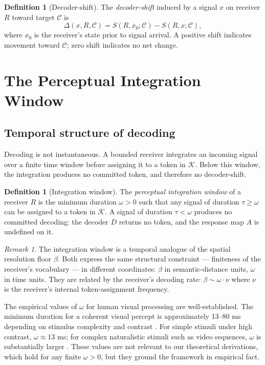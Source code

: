 \documentclass[twocolumn,11pt,a4paper]{article}
\theoremstyle{main}
\theoremstyle{definition}
\newtheorem{definition}[theorem]{Definition}
\theoremstyle{remark}
\newtheorem{remark}[theorem]{Remark}
\newcommand{\Know}{\mathcal{K}}
\newcommand{\Cell}{\mathcal{C}}
\newcommand{\Dec}{D}
\newcommand{\Recv}{R}
\newcommand{\Sval}{S}
\newcommand{\floor}{\beta}
\newcommand{\shift}{\Delta}
\newcommand{\window}{\omega}
\begin{document}
\begin{definition}[Decoder-shift]
\label{def:shift}
The \emph{decoder-shift} induced by a signal $x$ on receiver $\Recv$
toward target $\Cell$ is
\[
  \shift(x, \Recv, \Cell) = \Sval(\Recv, x_0; \Cell)
  - \Sval(\Recv, x; \Cell),
\]
where $x_0$ is the receiver's state prior to signal arrival. A positive
shift indicates movement toward $\Cell$; zero shift indicates no net
change.
\end{definition}

\section{The Perceptual Integration Window}
\label{sec:window}

\subsection{Temporal structure of decoding}

Decoding is not instantaneous. A bounded receiver integrates an incoming
signal over a finite time window before assigning it to a token in
$\Know$. Below this window, the integration produces no committed token,
and therefore no decoder-shift.

\begin{definition}[Integration window]
\label{def:window}
The \emph{perceptual integration window} of a receiver $\Recv$ is the
minimum duration $\window > 0$ such that any signal of duration
$\tau \geq \window$ can be assigned to a token in $\Know$. A signal of
duration $\tau < \window$ produces no committed decoding: the decoder
$\Dec$ returns no token, and the response map $A$ is undefined on it.
\end{definition}

\begin{remark}
The integration window is a temporal analogue of the spatial resolution
floor $\floor$. Both express the same structural constraint ---
finiteness of the receiver's vocabulary --- in different coordinates:
$\floor$ in semantic-distance units, $\window$ in time units. They are
related by the receiver's decoding rate: $\floor \sim \window \cdot \nu$
where $\nu$ is the receiver's internal token-assignment frequency.
\end{remark}

The empirical values of $\window$ for human visual processing are
well-established. The minimum duration for a coherent visual percept is
approximately 13--80 ms depending on stimulus complexity and contrast
\citep{efron1970, potter1975}. For simple stimuli under high contrast,
$\window \approx 13$ ms; for complex naturalistic stimuli such as
video sequences, $\window$ is substantially larger
\citep{potter1975, thorpe1996, keysers2001}. These values are not
relevant to our theoretical derivations, which hold for any finite
$\window > 0$, but they ground the framework in empirical fact.
\end{document}
